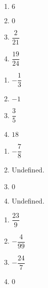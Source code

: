\begin{multicols}{4}
\begin{enumerate}

\item $6$
\item $0$
\item  $\dfrac{2}{21}$
\item  $\dfrac{19}{24}$

\setcounter{HW}{\value{enumi}}
\end{enumerate}
\end{multicols}

\begin{multicols}{4}
\begin{enumerate}
\setcounter{enumi}{\value{HW}}

\item  $-\dfrac{1}{3}$
\item  $-1$
\item  $\dfrac{3}{5}$
\item  $18$

\setcounter{HW}{\value{enumi}}
\end{enumerate}
\end{multicols}

\begin{multicols}{4}
\begin{enumerate}
\setcounter{enumi}{\value{HW}}

\item  $-\dfrac{7}{8}$
\item  Undefined.
\item  $0$
\item  Undefined.

\setcounter{HW}{\value{enumi}}
\end{enumerate}
\end{multicols}



\begin{multicols}{4}
\begin{enumerate}
\setcounter{enumi}{\value{HW}}

\item  $\dfrac{23}{9}$
\item  $-\dfrac{4}{99}$
\item  $-\dfrac{24}{7}$
\item  $0$

\setcounter{HW}{\value{enumi}}
\end{enumerate}
\end{multicols}

